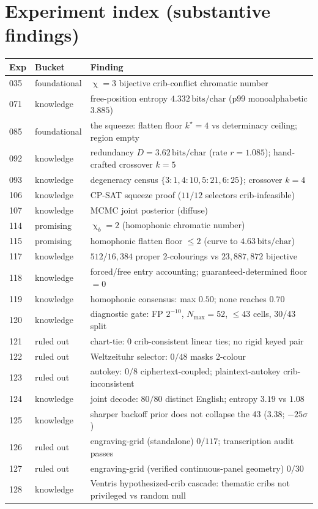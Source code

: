 \documentclass[11pt]{article}
\theoremstyle{plain}
\theoremstyle{definition}
\newcommand{\bits}{\,\text{bits/char}}
\DeclareMathOperator{\chrom}{\chi}
\begin{document}
\appendix
\section{Experiment index (substantive findings)}\label{app:index}

\begin{center}
\begin{tabular}{@{}l l p{9.6cm}@{}}
\toprule
Exp & Bucket & Finding \\
\midrule
035 & foundational & $\chrom=3$ bijective crib-conflict chromatic number \\
071 & knowledge & free-position entropy $4.332\bits$ (p99 monoalphabetic $3.885$) \\
085 & foundational & the squeeze: flatten floor $k^\star{=}4$ vs determinacy ceiling; region empty \\
092 & knowledge & redundancy $D{=}3.62\bits$ (rate $r{=}1.085$); hand-crafted crossover $k{=}5$ \\
093 & knowledge & degeneracy census $\{3{:}1,4{:}10,5{:}21,6{:}25\}$; crossover $k{=}4$ \\
106 & knowledge & CP-SAT squeeze proof ($11/12$ selectors crib-infeasible) \\
107 & knowledge & MCMC joint posterior (diffuse) \\
114 & promising & $\chrom_b{=}2$ (homophonic chromatic number) \\
115 & promising & homophonic flatten floor $\le2$ (curve to $4.63\bits$) \\
117 & knowledge & $512/16{,}384$ proper 2-colourings vs $23{,}887{,}872$ bijective \\
118 & knowledge & forced/free entry accounting; guaranteed-determined floor $=0$ \\
119 & knowledge & homophonic consensus: max $0.50$; none reaches $0.70$ \\
120 & knowledge & diagnostic gate: FP $2^{-10}$, $N_{\max}{=}52$, $\le43$ cells, $30/43$ split \\
121 & ruled out & chart-tie: $0$ crib-consistent linear ties; no rigid keyed pair \\
122 & ruled out & Weltzeituhr selector: $0/48$ masks 2-colour \\
123 & ruled out & autokey: $0/8$ ciphertext-coupled; plaintext-autokey crib-inconsistent \\
124 & knowledge & joint decode: $80/80$ distinct English; entropy $3.19$ vs $1.08$ \\
125 & knowledge & sharper backoff prior does not collapse the 43 ($3.38$; $-25\sigma$) \\
126 & ruled out & engraving-grid (standalone) $0/117$; transcription audit passes \\
127 & ruled out & engraving-grid (verified continuous-panel geometry) $0/30$ \\
128 & knowledge & Ventris hypothesized-crib cascade: thematic cribs not privileged vs random null \\
\bottomrule
\end{tabular}
\end{center}
\end{document}
